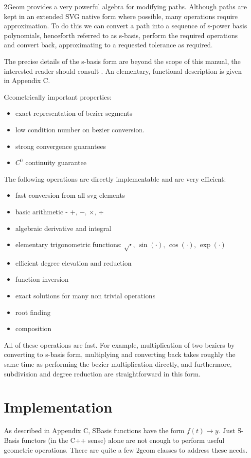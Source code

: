 \documentclass[openany]{book}
\begin{document}
2Geom provides a very powerful algebra for modifying paths.  Although
paths are kept in an extended SVG native form where possible, many
operations require approximation.  To do this we can convert a path
into a sequence of s-power basis polynomials, henceforth referred to
as s-basis, perform the required operations and convert back,
approximating to a requested tolerance as required.

The precise details of the s-basis form are beyond the scope of this
manual, the interested reader should consult \cite{SanchezReyes1997,SanchezReyes2000,SanchezReyes2001,SanchezReyes2003,SanchezReyes2004}.
An elementary, functional description is given in Appendix C.

Geometrically important properties:
\begin{itemize}
\item exact representation of bezier segments
\item low condition number on bezier conversion.
\item strong convergence guarantees
\item $C^0$ continuity guarantee
\end{itemize}

The following operations are directly implementable and are very efficient:
\begin{itemize}
\item fast conversion from all svg elements
\item basic arithmetic - $+$, $-$, $\times$, $\div$
\item algebraic derivative and integral
\item elementary trigonometric functions: $\sqrt{\cdot}$, $\sin(\cdot)$, $\cos(\cdot)$, $\exp(\cdot)$
\item efficient degree elevation and reduction
\item function inversion
\item exact solutions for many non trivial operations
\item root finding
\item composition
\end{itemize}

All of these operations are fast.  For example, multiplication of two
beziers by converting to s-basis form, multiplying and converting back
takes roughly the same time as performing the bezier multiplication
directly, and furthermore, subdivision and degree reduction are
straightforward in this form.

\section{Implementation}
As described in Appendix C, SBasis functions have the form $f(t) \rightarrow y$.
Just S-Basis functors (in the C++ sense) alone are not enough to perform
useful geometric operations.  There are quite a few 2geom classes to
address these needs.
\end{document}
